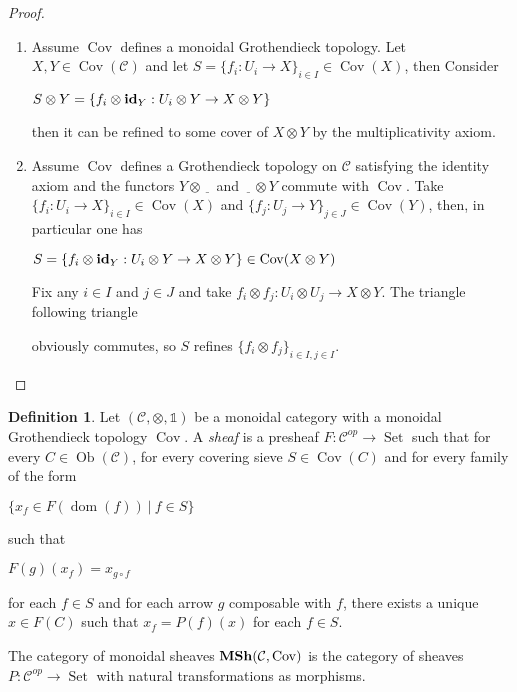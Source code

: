 \documentclass[8pt]{article}
\theoremstyle{definition}
\newtheorem{definition}{Definition}[section]
\theoremstyle{definition}
\theoremstyle{definition}
\theoremstyle{definition}
\theoremstyle{definition}
\theoremstyle{definition}
\theoremstyle{definition}
\theoremstyle{definition}
\theoremstyle{definition}
\theoremstyle{definition}
\theoremstyle{definition}
\theoremstyle{definition}
\theoremstyle{definition}
\theoremstyle{question}
\newcommand{\Ob}[1]{\operatorname{Ob}({\mathcal{#1}})}
\begin{document}
\begin{proof}
$ $
  \begin{enumerate}
    \item Assume $\operatorname{Cov}$ defines a monoidal Grothendieck topology. 
    Let $X, Y \in \operatorname{Cov}(\mathcal{C})$ and let $S = \{ f_i : U_i \to X \}_{i \in I} \in \operatorname{Cov}(X)$, then
    Consider
    \begin{center}
    $S \otimes Y = \{ f_i \otimes {\bf id}_Y : U_i \otimes Y \to X \otimes Y \}$
    \end{center}
    then it can be refined to some cover of $X \otimes Y$ by the multiplicativity axiom.
    \item Assume $\operatorname{Cov}$ defines a Grothendieck topology on $\mathcal{C}$
    satisfying the identity axiom and the functors $Y \otimes \underline{\:\:\:}$
    and $\underline{\:\:\:} \otimes Y$ commute with $\operatorname{Cov}$.
    Take $\{ f_i : U_i \to X \}_{i \in I} \in \operatorname{Cov}(X)$ and $\{ f_j : U_j \to Y \}_{j \in J} \in \operatorname{Cov}(Y)$,
      then, in particular one has
      \begin{center}
        $S = \{ f_i \otimes {\bf id}_Y : U_i \otimes Y \to X \otimes Y \} \in \operatorname{Cov}(X \otimes Y)$
      \end{center}
  
      Fix any $i \in I$ and $j \in J$ and take $f_i \otimes f_j : U_i \otimes U_j \to X \otimes Y$. The triangle
      following triangle

      \centerline{
      }
      obviously commutes, so $S$ refines $\{ f_i \otimes f_j\}_{i \in I, j \in I}$.
  \end{enumerate}
\end{proof}

\begin{definition}
Let $(\mathcal{C}, \otimes, \mathds{1})$ be a monoidal category with a monoidal Grothendieck topology $\operatorname{Cov}$.
A \emph{sheaf} is a presheaf $F : \mathcal{C}^{op} \to \operatorname{Set}$ such that for every 
$C \in \Ob{C}$, for every covering sieve $S \in \operatorname{Cov}(C)$ and for every family of the form
\begin{center}
  $\{ x_f \in F(\operatorname{dom}(f)) \: | \: f \in S \}$
\end{center}
such that
\begin{center}
  $F(g)(x_f) = x_{g \circ f}$
\end{center}
for each $f \in S$ and for each arrow $g$ composable with $f$,
there exists a unique $x \in F(C)$ such that $x_f = P(f)(x)$
for each $f \in S$.

The category of monoidal sheaves ${\bf MSh}(\mathcal{C}, \operatorname{Cov})$
is the category of sheaves $P : \mathcal{C}^{op} \to \operatorname{Set}$ with natural transformations
as morphisms.
\end{definition}
\end{document}
